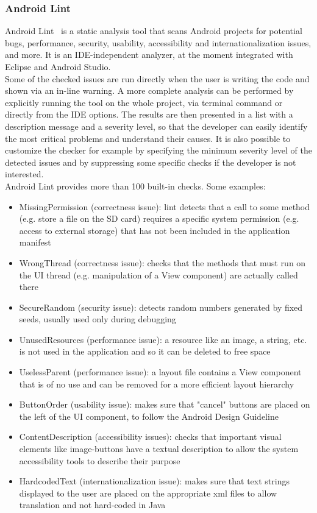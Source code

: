 \documentclass[11pt,a4paper,notitlepage]{article}
\begin{document}
\subsubsection{Android Lint}
Android Lint~\cite{Lint} is a static analysis tool that scans Android projects for potential bugs, performance, security, usability, accessibility and internationalization issues, and more. It is an IDE-independent analyzer, at the moment integrated with Eclipse and Android Studio.\medskip \\
Some of the checked issues are run directly when the user is writing the code and shown via an in-line warning. A more complete analysis can be performed by explicitly running the tool on the whole project, via terminal command or directly from the IDE options. The results are then presented in a list with a description message and a severity level, so that the developer can easily identify the most critical problems and understand their causes. It is also possible to customize the checker for example by specifying the minimum severity level of the detected issues and by suppressing some specific checks if the developer is not interested.\medskip \\
Android Lint provides more than 100 built-in checks. Some examples:
\begin{itemize}
	\item MissingPermission (correctness issue): lint detects that a call to some method (e.g. store a file on the SD card) requires a specific system permission (e.g. access to external storage) that has not been included in the application manifest
	\item WrongThread (correctness issue): checks that the methods that must run on the UI thread (e.g. manipulation of a View component) are actually called there
	\item SecureRandom (security issue): detects random numbers generated by fixed seeds, usually used only during debugging
	\item UnusedResources (performance issue): a resource like an image, a string, etc. is not used in the application and so it can be deleted to free space
	\item UselessParent (performance issue): a layout file contains a View component that is of no use and can be removed for a more efficient layout hierarchy
	\item ButtonOrder (usability issue): makes sure that "cancel" buttons are placed on the left of the UI component, to follow the Android Design Guideline 
	\item ContentDescription (accessibility issues): checks that important visual elements like image-buttons have a textual description to allow the system accessibility tools to describe their purpose
	\item HardcodedText (internationalization issue): makes sure that text strings displayed to the user are placed on the appropriate xml files to allow translation and not hard-coded in Java
\end{itemize}
\end{document}
